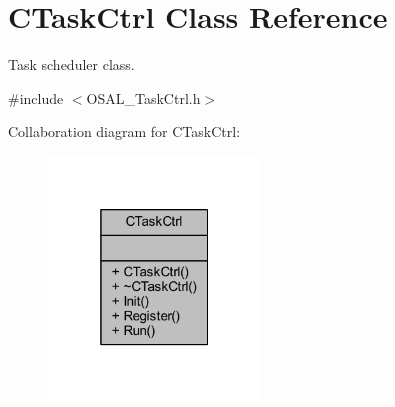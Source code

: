 \hypertarget{class_c_task_ctrl}{}\section{C\+Task\+Ctrl Class Reference}
\label{class_c_task_ctrl}


Task scheduler class.  




{\ttfamily \#include $<$O\+S\+A\+L\+\_\+\+Task\+Ctrl.\+h$>$}



Collaboration diagram for C\+Task\+Ctrl\+:\nopagebreak
\begin{figure}[H]
\begin{center}
\leavevmode
\includegraphics[width=160pt]{class_c_task_ctrl__coll__graph}
\end{center}
\end{figure}
